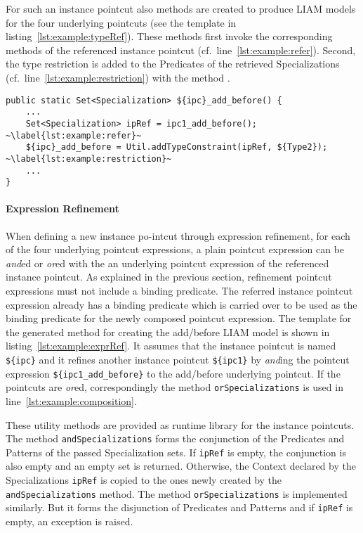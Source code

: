 For such an instance pointcut also methods are created to produce LIAM models for the four underlying pointcuts (see the template in listing~\ref{lst:example:typeRef}).
These methods first invoke the corresponding methods of the referenced instance pointcut (cf.\ line~\ref{lst:example:refer}).
Second, the type restriction is added to the Predicates of the retrieved Specializations (cf.\ line~\ref{lst:example:restriction}) with the method .

\begin{lstlisting}[caption={Template for creating the LIAM model for the type-refined instance pointcut},label={lst:example:typeRef}]
public static Set<Specialization> ${ipc}_add_before() {
	...
	Set<Specialization> ipRef = ipc1_add_before(); ~\label{lst:example:refer}~
	${ipc}_add_before = Util.addTypeConstraint(ipRef, ${Type2}); ~\label{lst:example:restriction}~
	...
}
\end{lstlisting}


\paragraph{Expression Refinement} 
When defining a new instance po-intcut through expression refinement, for each of the four underlying pointcut expressions, a plain pointcut expression can be \emph{and}ed or \emph{or}ed with the an underlying pointcut expression of the referenced instance pointcut. As explained in the previous section, refinement pointcut expressions must not include a binding predicate. The referred instance pointcut expression already has a binding predicate which is carried over to be used as the binding predicate for the newly composed pointcut expression.
The template for the generated method for creating the add/before LIAM model is shown in listing~\ref{lst:example:exprRef}.
It assumes that the instance pointcut is named \lstinline!${ipc}! and it refines another instance pointcut \lstinline!${ipc1}! by \emph{and}ing the pointcut expression \lstinline!${ipc1_add_before}! to the add/before underlying pointcut.
If the pointcuts are \emph{or}ed, correspondingly the method \lstinline!orSpecializations! is used in line~\ref{lst:example:composition}.

These utility methods are provided as runtime library for the instance pointcuts.
The method \lstinline!andSpecializations! forms the conjunction of the Predicates and Patterns of the passed Specialization sets.
If \lstinline!ipRef! is empty, the conjunction is also empty and an empty set is returned.
Otherwise, the Context declared by the Specializations \lstinline!ipRef! is copied to the ones newly created by the \lstinline!andSpecializations! method.
The method \lstinline!orSpecializations! is implemented similarly.
But it forms the disjunction of Predicates and Patterns and if \lstinline!ipRef! is empty, an exception is raised.

